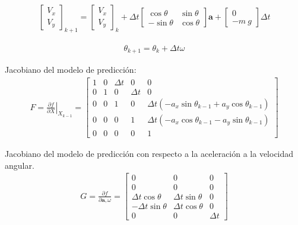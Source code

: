 \begin{align}
\begin{bmatrix} 
V_x \\ V_y 
\end{bmatrix}_{k+1}
=
\begin{bmatrix} 
V_x \\ V_y 
\end{bmatrix}_k + 
\Delta t
\begin{bmatrix} 
\cos{\theta} & \sin{\theta} \\ -\sin{\theta} & \cos{\theta}
\end{bmatrix}
\bm{a} +  
\begin{bmatrix} 
0 \\ - m\ g 
\end{bmatrix}\Delta t
\end{align}

\begin{align}
\theta_{k+1} = \theta_k + \Delta t \omega
\end{align}


Jacobiano del modelo de predicción:
\begin{align}
F =\left. \frac{\partial f}{\partial X}\right| _{X_{k-1}} =  
\begin{bmatrix} 
1 	&0	&\Delta t	&0		&0\\
0 	&1	&0		&\Delta t	&0\\
0 	&0	&1		&0		&\Delta t\left(-a_x\sin{\theta_{k-1}} + a_y\cos{\theta_{k-1}}\right) \\
0 	&0	&0		&1		&\Delta t\left(-a_x\cos{\theta_{k-1}} - a_y\sin{\theta_{k-1}}\right) \\
0 	&0	&0		&0		&1
\end{bmatrix}
\end{align}

Jacobiano del modelo de predicción con respecto a la aceleración a la velocidad angular. 
\begin{align}
G =  \frac{\partial f}{\partial \bm{a},\omega} = 
\begin{bmatrix} 
0 			&0			&0\\
0 			&0			&0\\
\Delta t \cos{\theta} 	&\Delta t \sin{\theta}	&0\\
-\Delta t \sin{\theta} 	&\Delta t \cos{\theta}	&0\\
0 			&0			&\Delta t		
\end{bmatrix}
\end{align}

